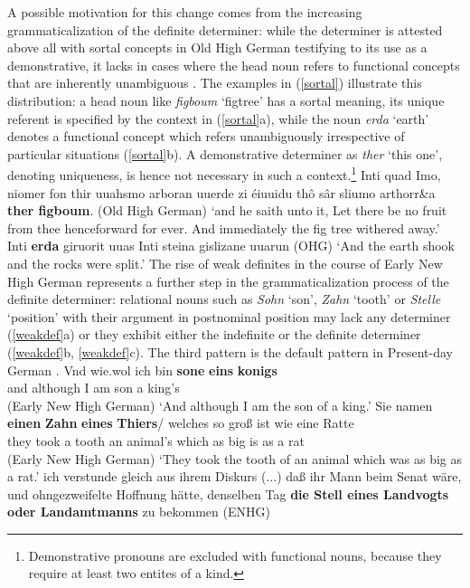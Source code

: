 \documentclass[output=paper
	        ,collection
	        ,collectionchapter
 	        ,biblatex
                ,babelshorthands
                ,newtxmath
                ,draftmode
                ,colorlinks, citecolor=brown
]{./langsci/langscibook}
\begin{document}
A possible motivation for this change comes from the increasing grammaticalization of the definite determiner: while the determiner is attested above all with sortal concepts in Old High German testifying to its use as a demonstrative, it lacks in cases where the head noun refers to functional concepts that are inherently unambiguous \citep{demske2001}. The examples in (\ref{sortal}) illustrate this distribution: a head noun like \textit{figboum} `figtree' has a sortal meaning, \ie its unique referent is specified by the context in (\ref{sortal}a), while the noun \textit{erda} `earth' denotes a functional concept which refers unambiguously irrespective of particular situations (\ref{sortal}b). A demonstrative determiner as \textit{ther} `this one', denoting uniqueness, is hence not necessary in such a context.\footnote{Demonstrative pronouns are excluded with functional nouns, because they require at least two entites of a kind.}
\eal \label{sortal}
\ex Inti quad Imo, niomer fon thir uuahsmo arboran uuerde zi éiuuidu thô sâr sliumo arthorr\&{a} \textbf{ther figboum}. \hfill (Old High German)
\glt `and he saith unto it, Let there be no fruit from thee henceforward for ever. And immediately the fig tree withered away.'
\ex Inti \textbf{erda} giruorit uuas Inti steina gislizane uuarun \hfill (OHG)
\glt `And the earth shook and the rocks were split.'  
\zl
The rise of weak definites in the course of Early New High German represents a further step in the grammaticalization process of the definite determiner: relational nouns such as \textit{Sohn} `son', \textit{Zahn} `tooth' or \textit{Stelle} `position' with their argument in postnominal position may lack any determiner (\ref{weakdef}a) or they exhibit either the indefinite or the definite determiner (\ref{weakdef}b, \ref{weakdef}c). The third pattern is the default pattern in Present-day German \citep{demske2020}.
\eal \label{weakdef}
\ex 
\gll Vnd wie.wol ich bin \textbf{sone} \textbf{eins} \textbf{konigs} \\  and although I am son a king's \\  \hfill (Early New High German)
\glt `And although I am the son of a king.'
\ex 
\gll Sie namen \textbf{einen} \textbf{Zahn} \textbf{eines} \textbf{Thiers}/ welches so groß ist wie eine Ratte \\ they took a tooth an animal's  which as big is as a rat  \\  \hfill (Early New High German)
\glt `They took the tooth of an animal which was as big as a rat.'
\ex ich verstunde gleich aus ihrem Diskurs (...) daß ihr Mann beim Senat wäre, und ohngezweifelte Hoffnung hätte, denselben Tag \textbf{die Stell eines Landvogts oder Landamtmanns} zu bekommen \hfill (ENHG)
\end{document}
